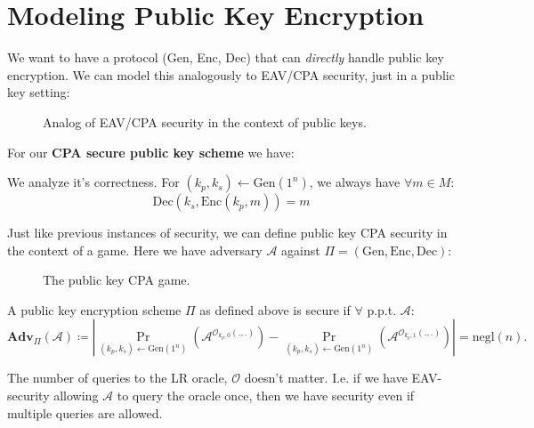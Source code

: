 \section{Modeling Public Key Encryption}
We want to have a protocol (Gen, Enc, Dec) that can \emph{directly} handle public key encryption. We can model this analogously to EAV/CPA security, just in a public key setting:

\begin{figure}[H]
	\centering
	\caption{Analog of EAV/CPA security in the context of public keys.}
	\label{fig:pubeavcpa}
\end{figure}

\begin{definition}
	For our \textbf{CPA secure public key scheme} we have:
	We analyze it's correctness. For \((k_p, k_s) \gets \mathrm{Gen}(1^n)\), we always have \(\forall m \in M\):
	\[
		\mathrm{Dec}(k_s, \mathrm{Enc}(k_p, m)) = m
	\] 
\end{definition}

Just like previous instances of security, we can define public key CPA security in the context of a game. Here we have adversary \(\mathcal{A} \) against \(\Pi = (\mathrm{Gen, Enc, Dec})\):

\begin{figure}[H]
	\centering
	\caption{The public key CPA game.}
	\label{fig:pubcpasec}
\end{figure}

\begin{definition}
	A public key encryption scheme \(\Pi\) as defined above is secure if \(\forall\) p.p.t. \(\mathcal{A} \):
	\[
		\mathbf{Adv}_\Pi (\mathcal{A}) \coloneqq \left| 
			\Pr_{(k_p, k_s) \gets \mathrm{Gen}(1^n)} (\mathcal{A}^{\mathcal{O}_{k_p, 0} (.,.)}) -
		  \Pr_{(k_p, k_s) \gets \mathrm{Gen}(1^n)} (\mathcal{A}^{\mathcal{O}_{k_p, 1} (.,.)})
		\right| =
		\mathrm{negl}(n).
	\]
\end{definition}
\begin{remark}
	The number of queries to the LR oracle, \(\mathcal{O} \) doesn't matter. I.e. if we have EAV-security allowing \(\mathcal{A} \) to query the oracle once, then we have security even if multiple queries are allowed.
\end{remark}

